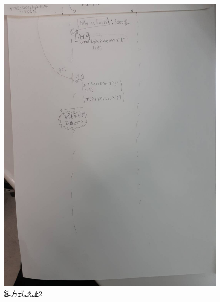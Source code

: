         \begin{figure}[H]
            \includegraphics[width=13cm]{fig/chapter3/certification/picture/2154.jpg}
            \caption{鍵方式認証2}
            \label{certification-2}
        \end{figure}


